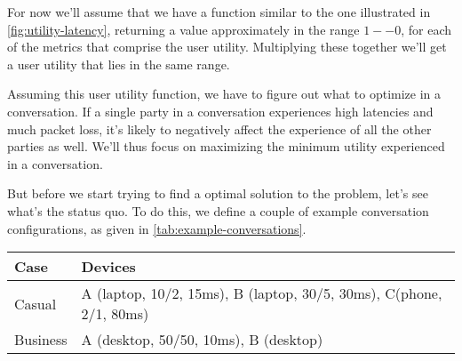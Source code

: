 
For now we'll assume that we have a function similar to the one illustrated in \autoref{fig:utility-latency}, returning a value approximately in the range \(1 -- 0\), for each of the metrics that comprise the user utility. Multiplying these together we'll get a user utility that lies in the same range.

Assuming this user utility function, we have to figure out what to optimize in a conversation. If a single party in a conversation experiences high latencies and much packet loss, it's likely to negatively affect the experience of all the other parties as well. We'll thus focus on maximizing the minimum utility experienced in a conversation.

But before we start trying to find a optimal solution to the problem, let's see what's the status quo. To do this, we define a couple of example conversation configurations, as given in \autoref{tab:example-conversations}.

\begin{center}
    \label{tab:example-conversations}
    \begin{tabular}{| l | l |}
    \hline
    \textbf{Case} & \textbf{Devices} \\ \hline
    Casual & A (laptop, 10/2, 15ms), B (laptop, 30/5, 30ms), C(phone, 2/1, 80ms) \\ \hline
    Business & A (desktop, 50/50, 10ms), B (desktop) \\ \hline
    \end{tabular}
\end{center}

